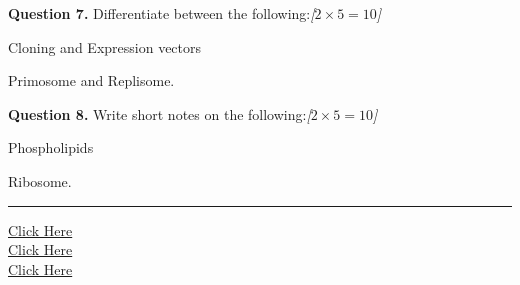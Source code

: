 \documentclass[11pt,a4paper]{article}
\newcommand{\pts}[1]{\hfill   \textit{[#1]}}
\begin{document}
\medskip


\noindent   \textbf{Question 7.} Differentiate between the following:\pts{$2  \times 5 = 10$}

\begin{parts}
  \item Cloning and Expression vectors
  \item Primosome and Replisome.
\end{parts}

\medskip


\noindent   \textbf{Question 8.} Write short notes on the following:\pts{$2  \times 5 = 10$}

\begin{parts}
  \item Phospholipids
  \item Ribosome.
\end{parts}

\vfill
\rule{\linewidth}{0.4pt}

\begin{center}\small
\href{https://bhu-exam.vercel.app/}{Click Here}\\[4pt]\href{https://me-aryan.vercel.app/}{Click Here}\\[4pt]\href{https://quashan-me.vercel.app/}{Click Here}
\end{center}
\end{document}
